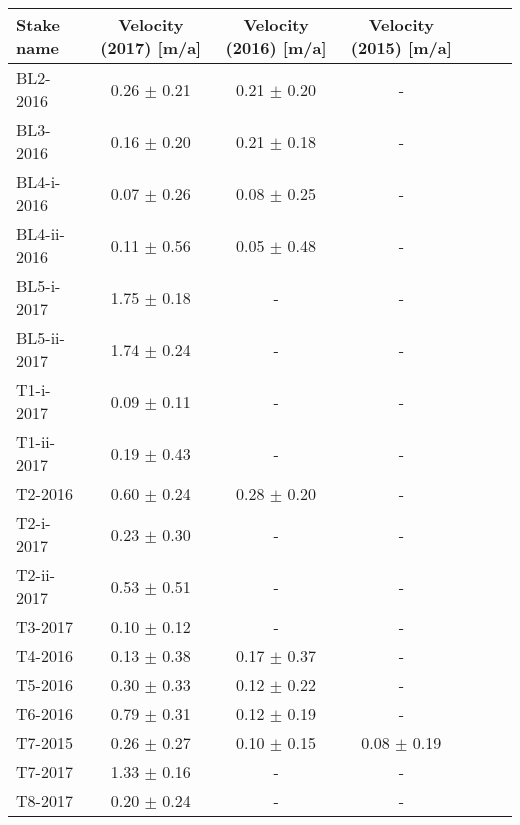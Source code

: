 \begin{tabular}{lcccccc}
\toprule
  Stake name & Velocity (2017) [m/a] & Velocity (2016) [m/a] & Velocity (2015) [m/a] \\
\midrule
    BL2-2016 &       0.26 $\pm$ 0.21 &       0.21 $\pm$ 0.20 &                     - \\
    BL3-2016 &       0.16 $\pm$ 0.20 &       0.21 $\pm$ 0.18 &                     - \\
  BL4-i-2016 &       0.07 $\pm$ 0.26 &       0.08 $\pm$ 0.25 &                     - \\
 BL4-ii-2016 &       0.11 $\pm$ 0.56 &       0.05 $\pm$ 0.48 &                     - \\
  BL5-i-2017 &       1.75 $\pm$ 0.18 &                     - &                     - \\
 BL5-ii-2017 &       1.74 $\pm$ 0.24 &                     - &                     - \\
   T1-i-2017 &       0.09 $\pm$ 0.11 &                     - &                     - \\
  T1-ii-2017 &       0.19 $\pm$ 0.43 &                     - &                     - \\
     T2-2016 &       0.60 $\pm$ 0.24 &       0.28 $\pm$ 0.20 &                     - \\
   T2-i-2017 &       0.23 $\pm$ 0.30 &                     - &                     - \\
  T2-ii-2017 &       0.53 $\pm$ 0.51 &                     - &                     - \\
     T3-2017 &       0.10 $\pm$ 0.12 &                     - &                     - \\
     T4-2016 &       0.13 $\pm$ 0.38 &       0.17 $\pm$ 0.37 &                     - \\
     T5-2016 &       0.30 $\pm$ 0.33 &       0.12 $\pm$ 0.22 &                     - \\
     T6-2016 &       0.79 $\pm$ 0.31 &       0.12 $\pm$ 0.19 &                     - \\
     T7-2015 &       0.26 $\pm$ 0.27 &       0.10 $\pm$ 0.15 &       0.08 $\pm$ 0.19 \\
     T7-2017 &       1.33 $\pm$ 0.16 &                     - &                     - \\
     T8-2017 &       0.20 $\pm$ 0.24 &                     - &                     - \\
\bottomrule
\end{tabular}
